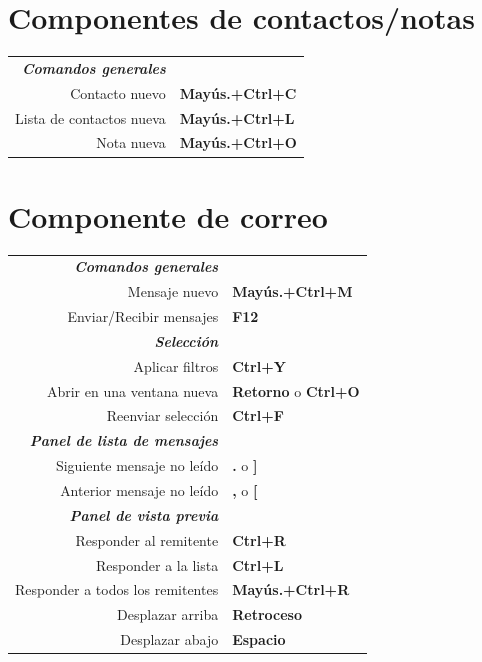 \documentclass[12pt]{article}
\begin{document}
\begin{landscape}
\begin{center}
\begin{multicols}{2}
	\section*{Componentes de contactos/notas}
	\begin{tabular*}{4in}{rp{1.5in}}
		\textit{\textbf{Comandos generales}}	&					\\
		Contacto nuevo				& \textbf{Mayús.+Ctrl+C}		\\
		Lista de contactos nueva		& \textbf{Mayús.+Ctrl+L}		\\
		Nota nueva				& \textbf{Mayús.+Ctrl+O}		\\
	\end{tabular*}
	\section*{Componente de correo}
	\begin{tabular*}{4in}{rp{1.5in}}
		\textit{\textbf{Comandos generales}}	&					\\
		Mensaje nuevo				& \textbf{Mayús.+Ctrl+M}		\\
		\vspace{1.5mm}
		Enviar/Recibir mensajes			& \textbf{F12}				\\
		\textit{\textbf{Selección}}		&					\\
		Aplicar filtros				& \textbf{Ctrl+Y}			\\
		Abrir en una ventana nueva		& \textbf{Retorno} o \textbf{Ctrl+O}	\\
		\vspace{1.5mm}
		Reenviar selección			& \textbf{Ctrl+F}			\\
		\textit{\textbf{Panel de lista de mensajes}} &					\\
		Siguiente mensaje no leído		& \textbf{.} o \textbf{]}		\\
		\vspace{1.5mm}
		Anterior mensaje no leído		& \textbf{,} o \textbf{[}		\\
		\textit{\textbf{Panel de vista previa}}	&					\\
		Responder al remitente			& \textbf{Ctrl+R}			\\
		Responder a la lista			& \textbf{Ctrl+L}			\\
		Responder a todos los remitentes	& \textbf{Mayús.+Ctrl+R}		\\
		Desplazar arriba			& \textbf{Retroceso}			\\
		Desplazar abajo				& \textbf{Espacio}			\\
	\end{tabular*}

\end{multicols}
\end{center}
\end{landscape}
\end{document}
